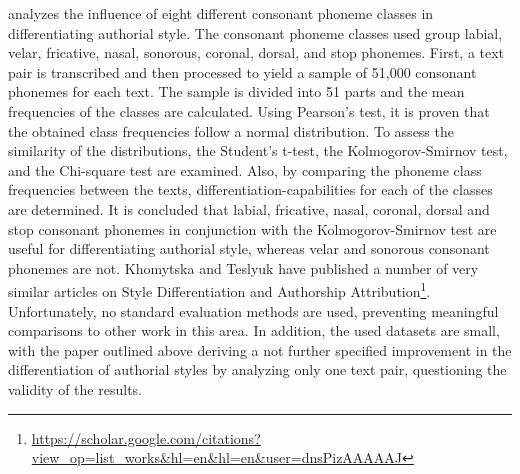 \cite{khomytska2019nonparametric} analyzes the influence of eight different consonant phoneme classes in differentiating authorial style.
The consonant phoneme classes used group labial, velar, fricative, nasal, sonorous, coronal, dorsal, and stop phonemes.
First, a text pair is transcribed and then processed to yield a sample of 51,000 consonant phonemes for each text.
The sample is divided into 51 parts and the mean frequencies of the classes are calculated.
Using Pearson's test, it is proven that the obtained class frequencies follow a normal distribution.
To assess the similarity of the distributions, the Student's t-test, the Kolmogorov-Smirnov test, and the Chi-square test are examined.
Also, by comparing the phoneme class frequencies between the texts, differentiation-capabilities for each of the classes are determined.
It is concluded that labial, fricative, nasal, coronal, dorsal and  stop consonant phonemes in conjunction with the Kolmogorov-Smirnov test are useful for differentiating authorial style, whereas velar and sonorous consonant phonemes are not.
Khomytska and Teslyuk have published a number of very similar articles on Style Differentiation and Authorship Attribution\footnote{\url{https://scholar.google.com/citations?view_op=list_works&hl=en&hl=en&user=dnsPizAAAAAJ}}.
Unfortunately, no standard evaluation methods are used, preventing meaningful comparisons to other work in this area.
In addition, the used datasets are small, with the paper outlined above deriving a not further specified improvement in the differentiation of authorial styles by analyzing only one text pair, questioning the validity of the results.


